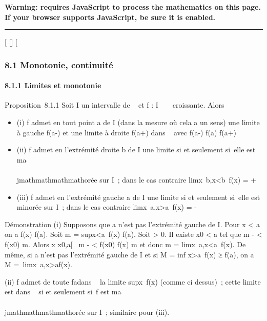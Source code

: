 \textbf{Warning: 
requires JavaScript to process the mathematics on this page.\\ If your
browser supports JavaScript, be sure it is enabled.}

\begin{center}\rule{3in}{0.4pt}\end{center}

{[}
{[}{]}
{[}

\subsubsection{8.1 Monotonie, continuité}

\paragraph{8.1.1 Limites et monotonie}

Proposition~8.1.1 Soit I un intervalle de ~ et f : I \rightarrow~ ~ croissante.
Alors

\begin{itemize}
\itemsep1pt\parskip0pt
\item
  (i) f admet en tout point a de I (dans la mesure où cela a un sens)
  une limite à gauche f(a-) et une limite à droite f(a+) dans ~ avec
  f(a-) \leq f(a) \leq f(a+)
\item
  (ii) f admet en l'extrémité droite b de I une limite si et seulement
  si~elle est ma\\\\jmathmathmathmathorée sur I~; dans le cas contraire
  limx\rightarrow~b,x\textless{}b~f(x) = +\infty~
\item
  (iii) f admet en l'extrémité gauche a de I une limite si et seulement
  si~elle est minorée sur I~; dans le cas contraire
  limx\rightarrow~a,x\textgreater{}a~f(x) = -\infty~
\end{itemize}

Démonstration (i) Supposons que a n'est pas l'extrémité gauche de I.
Pour x \textless{} a on a f(x) \leq f(a). Soit m
= supx\textless{}a~f(x) \leq f(a). Soit
\epsilon \textgreater{} 0. Il existe x0 \textless{} a tel que m - \epsilon
\textless{} f(x0) \leq m. Alors x \in{]}x0,a{[}\rigtharrow~ m - \epsilon
\textless{} f(x0) \leq f(x) \leq m et donc m
= limx\rightarrow~a,x\textless{}a~f(x). De même,
si a n'est pas l'extrémité gauche de I et si M
= inf x\textgreater{}a~f(x) ≥ f(a),
on a M =\
limx\rightarrow~a,x\textgreater{}af(x).

(ii) f admet de toute fa\ccon dans
\overline{}~ la limite
supx\inI~f(x) (comme ci dessus)~; cette
limite est dans \mathbb{R}~ si et seulement si~f est ma\\\\jmathmathmathmathorée sur I~; similaire
pour (iii).

